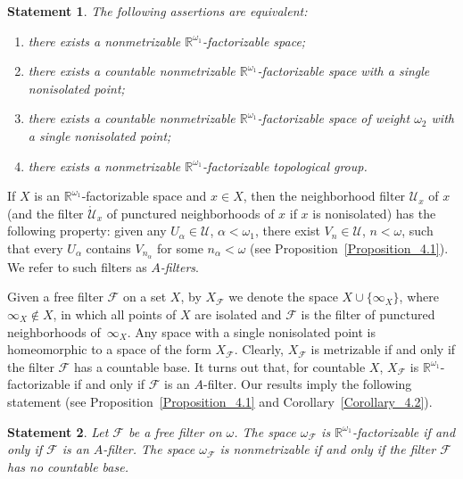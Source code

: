 \documentclass[a4paper,12pt]{amsart}
\newtheorem{statementA}{Statement}
\theoremstyle{definition}
\theoremstyle{remark}
\begin{document}
\begin{statementA}
\label{Statement_A}
The following assertions are equivalent:
\begin{enumerate}
\item[{\rm(1)}]
there exists a nonmetrizable $\mathbb R^{\omega_1}$-factorizable space;
\item[{\rm(2)}]
there exists a countable nonmetrizable $\mathbb R^{\omega_1}$-factorizable space with a single nonisolated point;
\item[{\rm(3)}]
there exists a countable nonmetrizable $\mathbb R^{\omega_1}$-factorizable space of weight $\omega_2$ with a 
single nonisolated point; 
\item[{\rm(4)}] 
there exists a nonmetrizable $\mathbb R^{\omega_1}$-factorizable 
topological group. 
\end{enumerate} 
\end{statementA}

If $X$ is an $\mathbb R^{\omega_1}$-factorizable space and $x\in X$, then the neighborhood filter $\mathscr U_x$ 
of $x$ (and the filter $\mathring {\mathscr U}_x$ of punctured neighborhoods of $x$ if $x$ 
is nonisolated) has the following property:
given any $U_\alpha\in \mathscr U$, $\alpha<\omega_1$, there exist $V_n\in \mathscr U$, $n<\omega$, 
such that every $U_\alpha$ contains $V_{n_\alpha}$ for some $n_\alpha<\omega$ 
(see Proposition~\ref{Proposition_4.1}).
We refer to such filters as \emph{$A$-filters}.

Given a free filter $\mathscr F$ on a set $X$, by $X_{\mathscr F}$ we denote the space $X\cup\{\infty_X\}$, where 
$\infty_X\notin X$, in which all points of $X$ are isolated and $\mathscr F$ is the filter of punctured 
neighborhoods of~$\infty_X$. Any space with a single nonisolated point is homeomorphic to a space of the form 
$X_{\mathscr F}$. Clearly, $X_{\mathscr F}$ is metrizable if and only if the filter $\mathscr F$ has a countable 
base. It turns out that, for countable $X$, $X_{\mathscr F}$ is $\mathbb R^{\omega_1}$-factorizable if and only 
if $\mathscr F$ is an $A$-filter. Our results imply the following statement (see Proposition~\ref{Proposition_4.1} 
and Corollary~\ref{Corollary_4.2}).

\begin{statementA}
\label{Statement_B}
Let $\mathscr F$ be a free filter on $\omega$. The space $\omega_{\mathscr F}$ is 
$\mathbb R^{\omega_1}$-factorizable if and only if $\mathscr F$ is an $A$-filter.
The space $\omega_{\mathscr F}$ is nonmetrizable if and only if the filter $\mathscr F$ has no 
countable base. 
\end{statementA}
\end{document}
